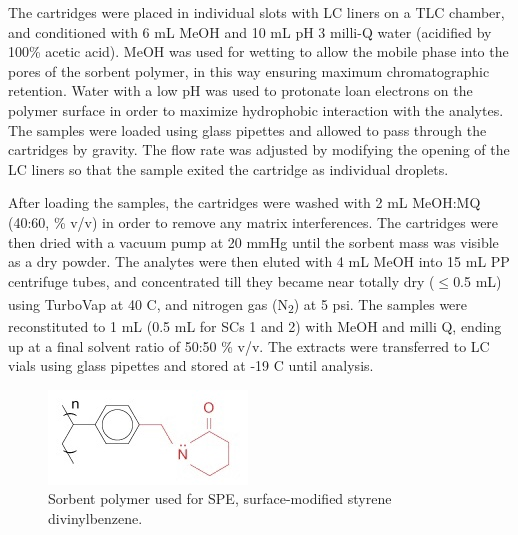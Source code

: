 The cartridges were placed in individual slots with LC liners on a TLC chamber, and conditioned with 6 mL MeOH and 10 mL pH 3 milli-Q water (acidified by 100\% acetic acid). MeOH was used for wetting to allow the mobile phase into the pores of the sorbent polymer, in this way ensuring maximum chromatographic retention. Water with a low pH was used to protonate loan electrons on the polymer surface in order to maximize hydrophobic interaction with the analytes. The samples were loaded using glass pipettes and allowed to pass through the cartridges by gravity. The flow rate was adjusted by modifying the opening of the LC liners so that the sample exited the cartridge as individual droplets. 

After loading the samples, the cartridges were washed with 2 mL MeOH:MQ (40:60, \% v/v) in order to remove any matrix interferences. The cartridges were then dried with a vacuum pump at 20 mmHg until the sorbent mass was visible as a dry powder. The analytes were then eluted with 4 mL MeOH into 15 mL PP centrifuge tubes, and concentrated till they became near totally dry ($\le$0.5 mL) using TurboVap\textsuperscript{\textregistered} at 40 \textdegree C, and nitrogen gas (N\textsubscript{2}) at 5 psi. The samples were reconstituted to 1 mL (0.5 mL for SCs 1 and 2) with MeOH and milli Q, ending up at a final solvent ratio of 50:50 \% v/v. The extracts were transferred to LC vials using glass pipettes and stored at -19 \textdegree C until analysis.

\begin{figure}
    \centering
    \includegraphics{Bilder/SPE_LCMS/mg_spe_strata-x.jpg}
    \caption{Sorbent polymer used for SPE, surface-modified styrene divinylbenzene.}
    \label{fig:StatPhase}
\end{figure}

